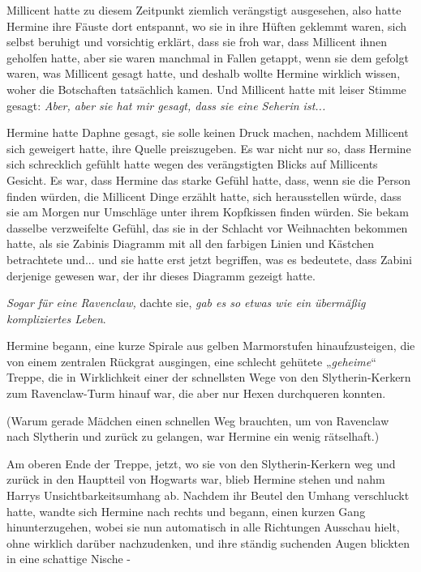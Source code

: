 {Millicent hatte zu diesem Zeitpunkt ziemlich verängstigt ausgesehen, also hatte Hermine ihre Fäuste dort entspannt, wo sie in ihre Hüften geklemmt waren, sich selbst beruhigt und vorsichtig erklärt, dass sie froh war, dass Millicent ihnen geholfen hatte, aber sie waren manchmal in Fallen getappt, wenn sie dem gefolgt waren, was Millicent gesagt hatte, und deshalb wollte Hermine wirklich wissen, woher die Botschaften tatsächlich kamen. Und Millicent hatte mit leiser Stimme gesagt: \emph{Aber, aber sie hat mir gesagt, dass sie eine Seherin ist...}

Hermine hatte Daphne gesagt, sie solle keinen Druck machen, nachdem Millicent sich geweigert hatte, ihre Quelle preiszugeben. Es war nicht nur so, dass Hermine sich schrecklich gefühlt hatte wegen des verängstigten Blicks auf Millicents Gesicht. Es war, dass Hermine das starke Gefühl hatte, dass, wenn sie die Person finden würden, die Millicent Dinge erzählt hatte, sich herausstellen würde, dass sie am Morgen nur Umschläge unter ihrem Kopfkissen finden würden. Sie bekam dasselbe verzweifelte Gefühl, das sie in der Schlacht vor Weihnachten bekommen hatte, als sie Zabinis Diagramm mit all den farbigen Linien und Kästchen betrachtete und... und sie hatte erst jetzt begriffen, was es bedeutete, dass Zabini derjenige gewesen war, der ihr dieses Diagramm gezeigt hatte.

\emph{Sogar für eine Ravenclaw,} dachte sie, \emph{gab es so etwas wie ein übermäßig kompliziertes Leben}.

Hermine begann, eine kurze Spirale aus gelben Marmorstufen hinaufzusteigen, die von einem zentralen Rückgrat ausgingen, eine schlecht gehütete „\emph{geheime}“ Treppe, die in Wirklichkeit einer der schnellsten Wege von den Slytherin-Kerkern zum Ravenclaw-Turm hinauf war, die aber nur Hexen durchqueren konnten.

(Warum gerade Mädchen einen schnellen Weg brauchten, um von Ravenclaw nach Slytherin und zurück zu gelangen, war Hermine ein wenig rätselhaft.)

Am oberen Ende der Treppe, jetzt, wo sie von den Slytherin-Kerkern weg und zurück in den Hauptteil von Hogwarts war, blieb Hermine stehen und nahm Harrys Unsichtbarkeitsumhang ab. Nachdem ihr Beutel den Umhang verschluckt hatte, wandte sich Hermine nach rechts und begann, einen kurzen Gang hinunterzugehen, wobei sie nun automatisch in alle Richtungen Ausschau hielt, ohne wirklich darüber nachzudenken, und ihre ständig suchenden Augen blickten in eine schattige Nische -

}
